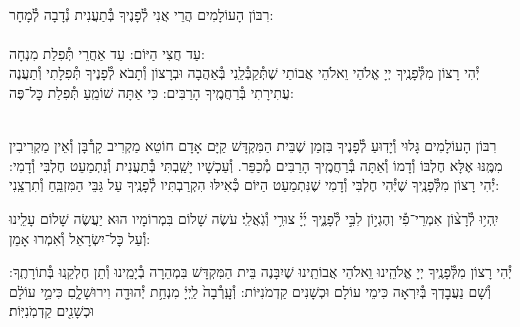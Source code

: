\documentclass[twoside, openany, parskip=half, 11pt]{book}
\begin{document}
\begin{sometimes}

\\
רִבּוֹן הָעוֹלָמִים הֲרֵי אֲנִי לְ֯פָנֶיךָ בְּ֯תַעֲנִית נְ֯דָבָה לְ֯מָחָר:\\
\\
עַד חֲצִי הַיּוֹם:  עַד אַחֲרֵי תְּ֯פִלַת מִנְחָה:\\
יְ֯הִי רָצוֹן מִלְּ֯פָנֶֽיךָ יְיָ אֱלֹהַי וֵאלֹהֵי אֲבוֹתַי שֶׁתְּ֯קַבְּ֯לֵֽנִי בְּ֯אַהֲבָה וּבְרָצוֹן וְ֯תָבֹא לְ֯פָנֶיךָ תְּ֯פִלָתִי
וְ֯תַעֲנֶה עֲתִירָתִי בְּ֯רַחֲמֶֽיךָ הָרַבִּים: כִּי אַתָּה שׁוֹמֵֽעַ תְּ֯פִלַת כׇּל־פֶּה: 

\sepline

\\
רִבּוֹן הָעוֹלָמִים גָּלוּי וְ֯יָדֽוּעַ לְ֯פָנֶיךָ בִּזְמַן שֶׁבֵּית הַמִּקְדָּשׁ קַיָּם אָדָם חוֹטֵא מַקְרִיב קָרְ֯בָּן וְ֯אֵין מַקְרִיבִין מִמֶּֽנּוּ אֶלָּא חֶלְבּוֹ וְ֯דָמוֹ וְ֯אַתָּה בְּ֯רַחֲמֶֽיךָ הָרַבִּים מְ֯כַפֵּר. וְ֯עַכְשָׁיו יָשַֽׁבְתִּי בְּ֯תַעֲנִית וְ֯נִתְמַעֵט חֶלְבִּי וְ֯דָמִי: יְ֯הִי רָצוֹן מִלְּ֯פָנֶֽיךָ שֶׁיְּ֯הִי חֶלְבִּי וְ֯דָמִי שֶׁנִּתְמַעַט הַיּוֹם כְּ֯אִילּוּ הִקְרַבְתִּיו לְ֯פָנֶֽיךָ עַל גַּבֵּי הַמִּזְבֵּֽחַ וְ֯תִרְצֵֽנִי:


\end{sometimes}

יִֽהְי֥וּ לְ֯רָצ֨וֹן אִמְרֵי־פִ֡י וְהֶגְי֣וֹן לִבִּ֣י לְ֯פָנֶ֑יךָ יְ֜יָ֗ צוּרִ֥י וְ֯גֹֽאֲלִֽי׃ עֹשֶׂה שָׁלוֹם בִּמְרוֹמָיו הוּא יַעֲשֶׂה שָׁלוֹם עָלֵֽינוּ וְ֯עַל כׇּל־יִשְׂרָאֵל וְ֯אִמְרוּ אָמֵן:


\begin{small}

יְ֯הִי רָצוֹן מִלְּ֯פָנֶֽיךָ יְיָ אֱלֹהֵֽינוּ וִֵאלֹהֵי אֲבוֹתֵֽינוּ שֶׁיִבָּנֶה בֵּית הַמִּקְדָּשׁ בִּמְהֵרָה בְ֯יָמֵֽינוּ וְ֯תֵן חֶלְקֵֽנוּ בְּ֯תוֹרָתֶֽךָ: וְ֯שָׁם נַעֲבׇדְךָ בְּ֯יִרְאָה כִּימֵי עוֹלָם וּכְשָׁנִים קַדְמֹנִיּוֹת:
וְ֯עָֽרְ֯בָה֙ לַֽיְיָ֔ מִנְחַ֥ת יְ֯הוּדָ֖ה וִירוּשָׁלָ֑םִ כִּימֵ֣י עוֹלָ֔ם וּכְשָׁנִ֖ים קַדְמֹֽנִיּֽוֹת׃


\end{small}



\\
\end{document}
